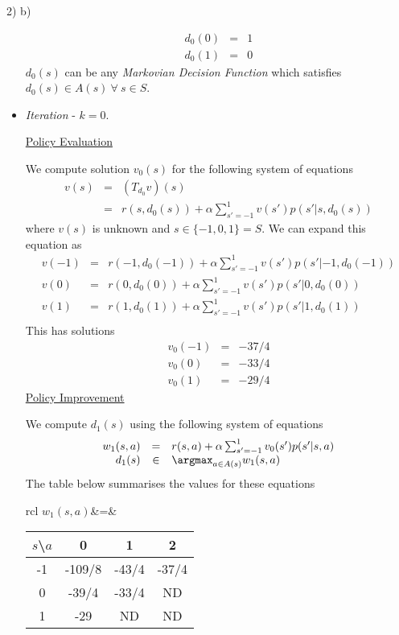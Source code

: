 \documentclass[11pt,a4paper]{article}
\begin{document}
\begin{answer}{2) b)}
\begin{itemize}
\[\begin{array}{rcl}
      d_0(0)&=&1\\
      d_0(1)&=&0
    \end{array}\]
    $d_0(s)$ can be any \textit{Markovian Decision Function} which satisfies $d_0(s)\in A(s)\ \forall\ s\in S$.
    \item \textit{Iteration} - $k=0$.
    \par \underline{Policy Evaluation}
    \par We compute solution $v_0(s)$ for the following system of equations
    \[\begin{array}{rcl}
      v(s)&=&(T_{d_0}v)(s)\\
      &=&r(s,d_0(s))+\alpha\sum_{s'=-1}^1v(s')p(s'|s,d_0(s))
    \end{array}\]
    where $v(s)$ is unknown and $s\in\{-1,0,1\}=S$. We can expand this equation as
    \[\begin{array}{rcl}
      v(-1)&=&r(-1,d_0(-1))+\alpha\sum_{s'=-1}^1v(s')p(s'|-1,d_0(-1))\\
      v(0)&=&r(0,d_0(0))+\alpha\sum_{s'=-1}^1v(s')p(s'|0,d_0(0))\\
      v(1)&=&r(1,d_0(1))+\alpha\sum_{s'=-1}^1v(s')p(s'|1,d_0(1))\\
    \end{array}\]
    This has solutions
    \[\begin{array}{rcl}
      v_0(-1)&=&-37/4\\
      v_0(0)&=&-33/4\\
      v_0(1)&=&-29/4
    \end{array}\]
    \underline{Policy Improvement}
    \par We compute $d_1(s)$ using the following system of equations
    \[\begin{array}{rcl}
      w_1(s,a)&=&r(s,a)+\alpha\sum_{s'=-1}^1v_0(s')p(s'|s,a)\\
      d_1(s)&\in&\argmax_{a\in A(s)}w_1(s,a)
    \end{array}\]
    The table below summarises the values for these equations
    \begin{center}
      \begin{tabular}{rcl}
        $w_1(s,a)$&=&\begin{tabular}{c|ccc}
          $s$\textbackslash$a$&0&1&2\\\hline
          -1&-109/8&-43/4&-37/4\\
          0&-39/4&-33/4&ND\\
          1&-29&ND&ND
        \end{tabular}\\

\end{tabular}
\end{center}
\end{itemize}
\end{answer}
\end{document}
